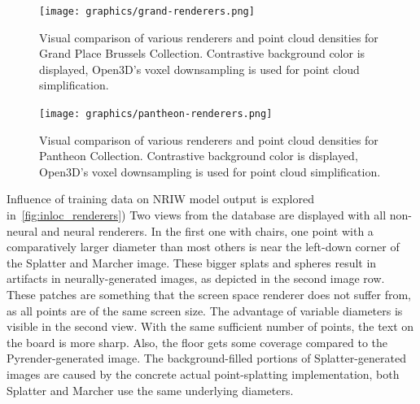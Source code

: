 \begin{figure}
    \centering
    \texttt{[image: graphics/grand-renderers.png]}
    \caption[Visual comparison of various renderers and point cloud
    densities for Grand Place Brussels Collection]{Visual comparison
    of various renderers and point cloud densities for Grand Place Brussels
    Collection. Contrastive background color is displayed, Open3D's
    voxel downsampling is used for point cloud simplification.}
    \label{fig:grand_renderers}
\end{figure}

\begin{figure}
    \centering
    \texttt{[image: graphics/pantheon-renderers.png]}
    \caption[Visual comparison of various renderers and point cloud
    densities for Pantheon Collection]{Visual comparison of various
    renderers and point cloud densities for Pantheon Collection.
    Contrastive background color is displayed, Open3D's voxel downsampling is used
    for point cloud simplification.}
    \label{fig:pantheon_renderers}
\end{figure}

Influence of training data on NRIW model output is explored
in~\cref{fig:inloc_renderers}) Two views from the database are displayed
with all non-neural and neural renderers. In the first one with chairs,
one point with a comparatively larger diameter than most others is 
near the left-down corner of the Splatter and Marcher image. These bigger splats
and spheres result in artifacts in neurally-generated images, as 
depicted in the second image row. These patches are something that the screen space
renderer does not suffer from, as all points are of the same screen size.
The advantage of variable diameters
is visible in the second view. With the same sufficient number of points,
the text on the board is more sharp. Also, the floor gets some coverage 
compared to the Pyrender-generated image. The background-filled portions of
Splatter-generated images are caused by the concrete actual point-splatting
implementation, both Splatter and Marcher use the same underlying diameters.\\

